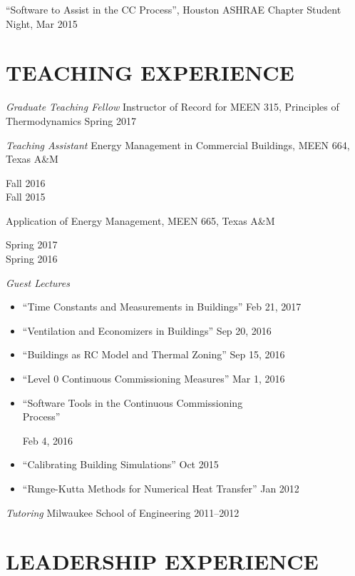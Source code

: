 \documentclass[margin]{res} %
\begin{document}
\begin{resume}
``Software to Assist in the CC Process'', Houston ASHRAE Chapter Student Night, Mar 2015


\section{TEACHING EXPERIENCE}
{\sl Graduate Teaching Fellow }\newline
Instructor of Record for MEEN 315, Principles of Thermodynamics \hfill Spring 2017

{\sl Teaching Assistant}\newline
Energy Management in Commercial Buildings, MEEN 664, Texas A\&M \hfill \parbox[t]{1.5cm}{\raggedleft Fall 2016 \\ Fall 2015} \par

\vspace{10pt}

Application of Energy Management, MEEN 665, Texas A\&M \hfill \parbox[t]{2cm}{\raggedleft Spring 2017 \\ Spring 2016}

\vspace{10pt}
{\sl Guest Lectures}
\begin{itemize}
    \item ``Time Constants and Measurements in Buildings'' \hfill Feb 21, 2017
    \item ``Ventilation and Economizers in Buildings'' \hfill Sep 20, 2016
    \item ``Buildings as RC Model and Thermal Zoning'' \hfill Sep 15, 2016
    \item ``Level 0 Continuous Commissioning Measures'' \hfill Mar 1, 2016
    \item  \parbox{10cm}{``Software Tools in the Continuous Commissioning \\ Process''} \hfill Feb 4, 2016
    \item ``Calibrating Building Simulations'' \hfill Oct 2015
    \item ``Runge-Kutta Methods for Numerical Heat Transfer'' \hfill Jan 2012
\end{itemize}

\medskip


{\sl Tutoring} \newline
Milwaukee School of Engineering \hfill 2011--2012

\section{LEADERSHIP EXPERIENCE}


\end{resume}
\end{document}
